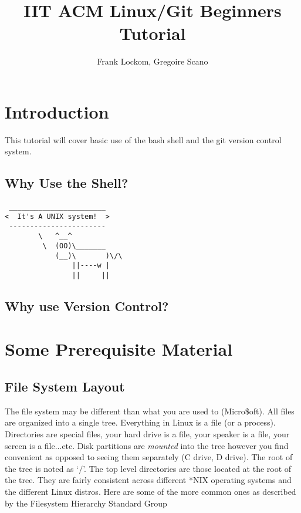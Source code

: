 \documentclass[10pt]{article}
\title{IIT ACM Linux/Git Beginners Tutorial}
\author{Frank Lockom, Gregoire Scano}
\begin{document}
\maketitle

\section{Introduction}
This tutorial will cover basic use of the bash shell and the git version control system.

  \subsection{Why Use the Shell?}  
  
  \begin{verbatim}
 _______________________ 
<  It's A UNIX system!  >
 ----------------------- 
        \   ^__^
         \  (OO)\_______
            (__)\       )\/\
                ||----w |
                ||     ||
  \end{verbatim}


  \subsection{Why use Version Control?}

\section{Some Prerequisite Material}

  \subsection{File System Layout}  
  The file system may be different than what you are used to (Micro\$oft). All files are organized into a single tree. Everything in Linux is a file (or a process). Directories are special files, your hard drive is a file, your speaker is a file, your screen is a file...etc. Disk partitions are \textit{mounted} into the tree however you find convenient as opposed to seeing them separately (C drive, D drive). The root of the tree is noted as `$/$'. The top level directories are those located at the root of the tree. They are fairly consistent across different *NIX operating systems and the different Linux distros. Here are some of the more common ones as described by the Filesystem Hierarchy Standard Group~\cite{fhs}
\end{document}
